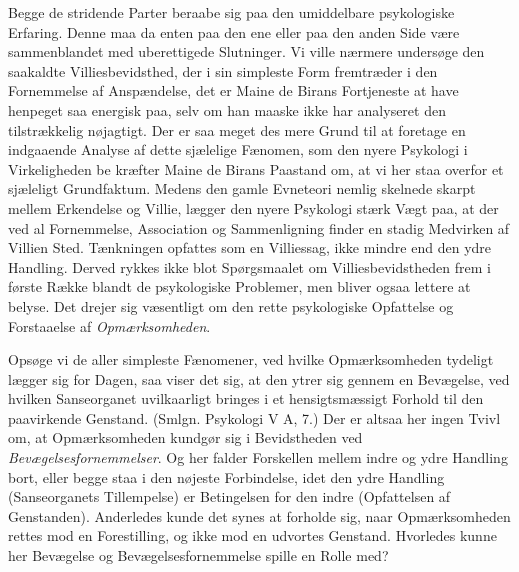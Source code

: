 \documentclass[12pt,a4paper,openany]{book}
\newcommand{\opage}[1]{\marginnote{\footnotesize\textit{[#1]}}}
\begin{document}
Begge de stridende Parter beraabe sig paa den umiddelbare psykologiske
Erfaring. Denne maa da enten paa den ene eller paa den anden Side være
sammenblandet med uberettigede Slutninger. Vi ville nærmere undersøge den
saakaldte Villiesbevidsthed, der i sin simpleste Form fremtræder i den
Fornemmelse af Anspændelse, det er Maine de Birans Fortjeneste at have henpeget
saa energisk paa, selv om han maaske ikke har analyseret den tilstrækkelig
nøjagtigt. Der er saa meget des mere Grund til at foretage en indgaaende
Analyse af dette sjælelige Fænomen, som den nyere Psykologi i Virkeligheden be%
\setcounter{footnote}{0}%
\opage{69}kræfter Maine de Birans Paastand om, at vi her staa overfor et
sjæleligt Grundfaktum. Medens den gamle Evneteori nemlig skelnede skarpt mellem
Erkendelse og Villie, lægger den nyere Psykologi stærk Vægt paa, at der ved al
Fornemmelse, Association og Sammenligning finder en stadig Medvirken af Villien
Sted. Tænkningen opfattes som en Villiessag, ikke mindre end den ydre Handling.
Derved rykkes ikke blot Spørgsmaalet om Villiesbevidstheden frem i første Række
blandt de psykologiske Problemer, men bliver ogsaa lettere at belyse. Det
drejer sig væsentligt om den rette psykologiske Opfattelse og Forstaaelse af
\emph{Opmærksomheden}.

Opsøge vi de aller simpleste Fænomener, ved hvilke Opmærksomheden tydeligt
lægger sig for Dagen, saa viser det sig, at den ytrer sig gennem en Bevægelse,
ved hvilken Sanseorganet uvilkaarligt bringes i et hensigtsmæssigt Forhold til
den paavirkende Genstand. (Smlgn. Psykologi V A, 7.) Der er altsaa her ingen
Tvivl om, at Opmærksomheden kundgør sig i Bevidstheden ved
\emph{Bevægelsesfornemmelser}. Og her falder Forskellen mellem indre og ydre
Handling bort, eller begge staa i den nøjeste Forbindelse, idet den ydre
Handling (Sanseorganets Tillempelse) er Betingelsen for den indre (Opfattelsen
af Genstanden). Anderledes kunde det synes at forholde sig, naar Opmærksomheden
rettes mod en Forestilling, og ikke mod en udvortes Genstand. Hvorledes kunne
her Bevægelse og Bevægelsesfornemmelse spille en Rolle med?
\end{document}
